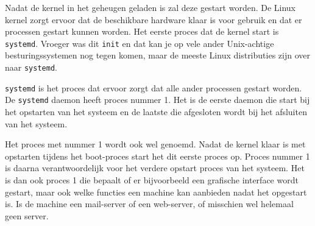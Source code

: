Nadat de kernel in het geheugen geladen is zal deze gestart worden. De Linux kernel zorgt ervoor dat de beschikbare hardware klaar is voor gebruik en dat er processen gestart kunnen worden. Het eerste proces dat de kernel start is \texttt{systemd}. Vroeger was dit \texttt{init} en dat kan je op vele ander Unix-achtige besturingssystemen nog tegen komen, maar de meeste Linux distributies zijn over naar \texttt{systemd}.

\texttt{systemd} is het proces dat ervoor zorgt dat alle ander processen gestart worden. De \texttt{systemd} daemon heeft proces nummer 1. Het is de eerste daemon die start bij het opstarten van het systeem en de laatste die afgesloten wordt bij het afsluiten van het systeem.

Het proces met nummer 1 wordt ook wel  genoemd. Nadat de kernel klaar is met opstarten tijdens het boot-proces start het dit eerste proces op. Proces nummer 1 is daarna verantwoordelijk voor het verdere opstart proces van het systeem. Het is dan ook proces 1 die bepaalt of er bijvoorbeeld een grafische interface wordt gestart, maar ook welke functies een machine kan aanbieden nadat het opgestart is. Is de machine een mail-server of een web-server, of misschien wel helemaal geen server.

